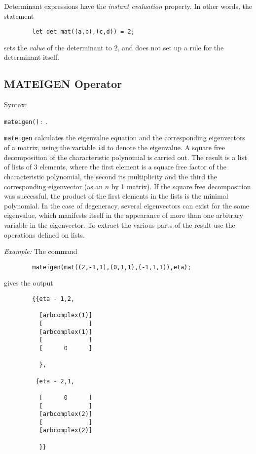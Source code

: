 Determinant expressions have the \emph{instant evaluation} property.
  In other words, the statement
\begin{verbatim}
        let det mat((a,b),(c,d)) = 2;
\end{verbatim}
sets the \emph{value} of the determinant to 2, and does not set up a rule
for the determinant itself.

\subsection{MATEIGEN Operator}
\hypertarget{operator:MATEIGEN}{}
Syntax:
\begin{syntax}
        \texttt{mateigen(}\texttt{)}\,:\, .
\end{syntax}

\texttt{mateigen} calculates the eigenvalue equation and the corresponding
eigenvectors of a matrix, using the variable \texttt{id} to denote the
eigenvalue.  A square free decomposition of the characteristic polynomial
is carried out.  The result is a list of lists of 3 elements, where the
first element is a square free factor of the characteristic polynomial,
the second its multiplicity and the third the corresponding eigenvector
(as an $n$ by 1 matrix).  If the square free decomposition was
successful, the product of the first elements in the lists is the minimal
polynomial.  In the case of degeneracy, several eigenvectors can exist for
the same eigenvalue, which manifests itself in the appearance of more than
one arbitrary variable in the eigenvector.  To extract the various parts
of the result use the operations defined on lists.

\textit{Example:}
 The command
\begin{verbatim}
        mateigen(mat((2,-1,1),(0,1,1),(-1,1,1)),eta);
\end{verbatim}
gives the output
\begin{verbatim}
        {{eta - 1,2,

          [arbcomplex(1)]
          [             ]
          [arbcomplex(1)]
          [             ]
          [      0      ]

          },

         {eta - 2,1,

          [      0      ]
          [             ]
          [arbcomplex(2)]
          [             ]
          [arbcomplex(2)]

          }}
\end{verbatim}


